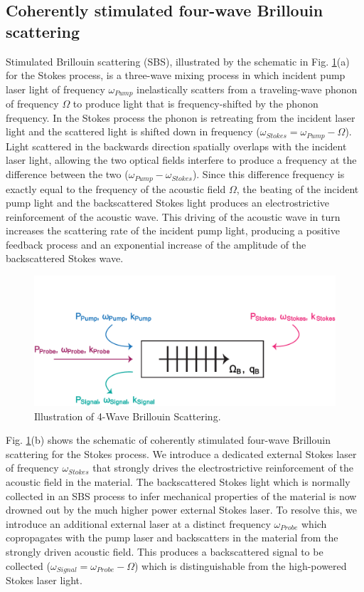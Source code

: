 \documentclass[%
  reprint,
  superscriptaddress,
  amsmath,amssymb,
  aps,
  prapplied,
]{revtex4-2}
\begin{document}
\subsection*{Coherently stimulated four-wave Brillouin scattering}
\label{Theoretical Framework:Coherently stimulated five-wave Brillouin scattering}
Stimulated Brillouin scattering (SBS), illustrated by the schematic in Fig. \ref{fig:4-Wave-Brillouin-Scattering}(a) for the Stokes process, is a three-wave mixing process in which incident pump laser light of frequency $\omega_{Pump}$ inelastically scatters from a traveling-wave phonon of frequency $\Omega$ to produce light that is frequency-shifted by the phonon frequency. In the Stokes process the phonon is retreating from the incident laser light and the scattered light is shifted down in frequency ($\omega_{Stokes} = \omega_{Pump} - \Omega$). Light scattered in the backwards direction spatially overlaps with the incident laser light, allowing the two optical fields interfere to produce a frequency at the difference between the two ($\omega_{Pump} - \omega_{Stokes}$). Since this difference frequency is exactly equal to the frequency of the acoustic field $\Omega$, the beating of the incident pump light and the backscattered Stokes light produces an electrostrictive reinforcement of the acoustic wave. This driving of the acoustic wave in turn increases the scattering rate of the incident pump light, producing a positive feedback process and an exponential increase of the amplitude of the backscattered Stokes wave.

\begin{figure}[t]
  \centering
  \includegraphics[width=.5\textwidth]{4-Wave-Brillouin-Scattering.pdf}
  \caption{Illustration of 4-Wave Brillouin Scattering.}
  \label{fig:4-Wave-Brillouin-Scattering}
\end{figure}

Fig. \ref{fig:4-Wave-Brillouin-Scattering}(b) shows the schematic of coherently stimulated four-wave Brillouin scattering for the Stokes process. We introduce a dedicated external Stokes laser of frequency $\omega_{Stokes}$ that strongly drives the electrostrictive reinforcement of the acoustic field in the material. The backscattered Stokes light which is normally collected in an SBS process to infer mechanical properties of the material is now drowned out by the much higher power external Stokes laser. To resolve this, we introduce an additional external laser at a distinct frequency $\omega_{Probe}$ which copropagates with the pump laser and backscatters in the material from the strongly driven acoustic field. This produces a backscattered signal to be collected ($\omega_{Signal} = \omega_{Probe} - \Omega$) which is distinguishable from the high-powered Stokes laser light.
\end{document}
